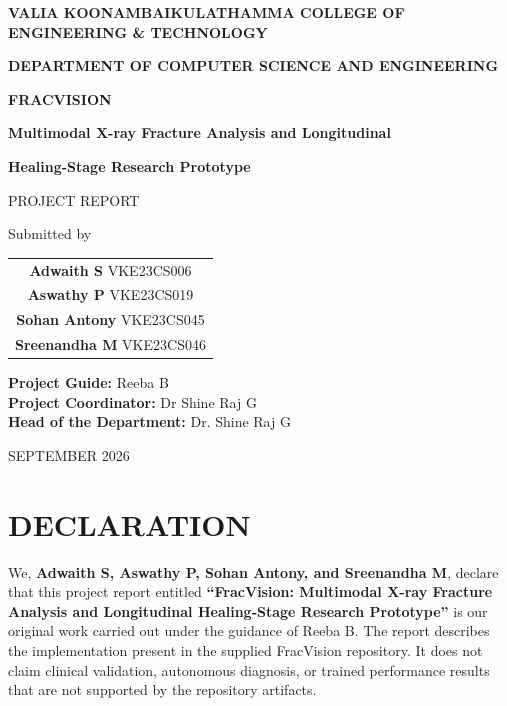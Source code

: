 \documentclass[12pt,a4paper]{article}
\begin{document}
\begin{titlepage}
\thispagestyle{empty}
\begin{center}
{\Large\bfseries VALIA KOONAMBAIKULATHAMMA COLLEGE OF ENGINEERING \& TECHNOLOGY\par}
\vspace{8pt}
{\large\bfseries DEPARTMENT OF COMPUTER SCIENCE AND ENGINEERING\par}
\vspace{25pt}
{\Large\bfseries FRACVISION\par}
\vspace{7pt}
{\large\bfseries Multimodal X-ray Fracture Analysis and Longitudinal\par}
{\large\bfseries Healing-Stage Research Prototype\par}
\vspace{20pt}
{\large PROJECT REPORT\par}
\vspace{12pt}
Submitted by
\vspace{8pt}
\begin{tabular}{c}
\textbf{Adwaith S} \quad VKE23CS006\\
\textbf{Aswathy P} \quad VKE23CS019\\
\textbf{Sohan Antony} \quad VKE23CS045\\
\textbf{Sreenandha M} \quad VKE23CS046
\end{tabular}
\vfill
\textbf{Project Guide:} Reeba B\\
\textbf{Project Coordinator:} Dr Shine Raj G\\
\textbf{Head of the Department:} Dr. Shine Raj G
\vspace{18pt}

SEPTEMBER 2026
\end{center}
\end{titlepage}

\section*{DECLARATION}
We, \textbf{Adwaith S, Aswathy P, Sohan Antony, and Sreenandha M}, declare that this project report entitled \textbf{“FracVision: Multimodal X-ray Fracture Analysis and Longitudinal Healing-Stage Research Prototype”} is our original work carried out under the guidance of Reeba B. The report describes the implementation present in the supplied FracVision repository. It does not claim clinical validation, autonomous diagnosis, or trained performance results that are not supported by the repository artifacts.
\end{document}
